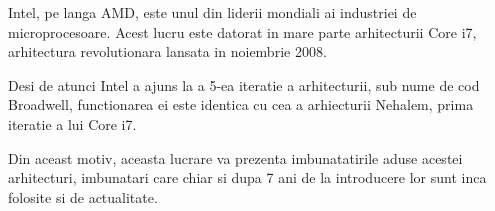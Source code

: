 Intel, pe langa AMD, este unul din liderii mondiali ai industriei de microprocesoare. Acest lucru
este datorat in mare parte arhitecturii Core i7, arhitectura revolutionara lansata in noiembrie
2008.

Desi de atunci Intel a ajuns la a 5-ea iteratie a arhitecturii, sub nume de cod Broadwell, functionarea
 ei este identica cu cea a arhiecturii Nehalem, prima iteratie a lui Core i7.

Din aceast motiv, aceasta lucrare va prezenta imbunatatirile aduse acestei arhitecturi, imbunatari care
chiar si dupa 7 ani de la introducere lor sunt inca folosite si de actualitate.


